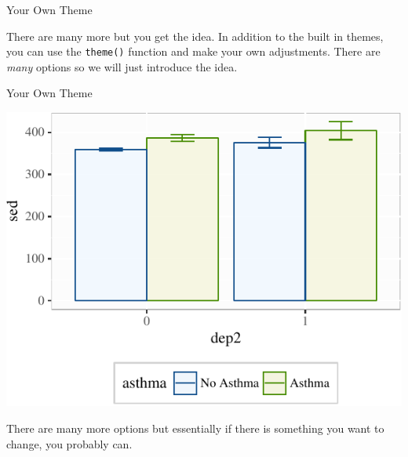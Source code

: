 \begin{frame}[fragile]{Your Own Theme}

There are many more but you get the idea. In addition to the built in
themes, you can use the \texttt{theme()} function and make your own
adjustments. There are \emph{many} options so we will just introduce the
idea.

\begin{Shaded}
\begin{Highlighting}[]
\OperatorTok{+}\StringTok{ }
\StringTok{  }\NormalTok{(} \NormalTok{,  }
         \NormalTok{(} \NormalTok{),}
         \NormalTok{(} \NormalTok{, }
                                         \NormalTok{), }
         \NormalTok{(} \NormalTok{))  }
\end{Highlighting}
\end{Shaded}

\end{frame}

\begin{frame}{Your Own Theme}

\includegraphics{09_AdvancedPlotting_files/figure-beamer/t1-1.pdf}

There are many more options but essentially if there is something you
want to change, you probably can.

\end{frame}

